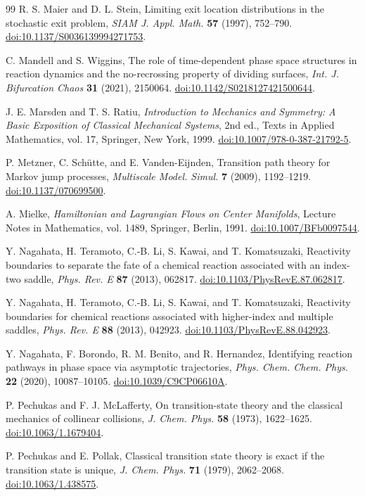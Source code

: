\documentclass[11pt]{article}
\theoremstyle{definition}
\theoremstyle{remark}
\newcommand{\doi}[1]{\href{https://doi.org/#1}{doi:#1}}
\begin{document}
\begin{thebibliography}{99}
R. S. Maier and D. L. Stein,
Limiting exit location distributions in the stochastic exit problem,
\emph{SIAM J. Appl. Math.} \textbf{57} (1997), 752--790.
\doi{10.1137/S0036139994271753}.

C. Mandell and S. Wiggins,
The role of time-dependent phase space structures in reaction dynamics and the no-recrossing property of dividing surfaces,
\emph{Int. J. Bifurcation Chaos} \textbf{31} (2021), 2150064.
\doi{10.1142/S0218127421500644}.

J. E. Marsden and T. S. Ratiu,
\emph{Introduction to Mechanics and Symmetry: A Basic Exposition of Classical Mechanical Systems},
2nd ed., Texts in Applied Mathematics, vol. 17, Springer, New York, 1999.
\doi{10.1007/978-0-387-21792-5}.

P. Metzner, C. Sch\"utte, and E. Vanden-Eijnden,
Transition path theory for Markov jump processes,
\emph{Multiscale Model. Simul.} \textbf{7} (2009), 1192--1219.
\doi{10.1137/070699500}.

A. Mielke,
\emph{Hamiltonian and Lagrangian Flows on Center Manifolds},
Lecture Notes in Mathematics, vol. 1489, Springer, Berlin, 1991.
\doi{10.1007/BFb0097544}.

Y. Nagahata, H. Teramoto, C.-B. Li, S. Kawai, and T. Komatsuzaki,
Reactivity boundaries to separate the fate of a chemical reaction associated with an index-two saddle,
\emph{Phys. Rev. E} \textbf{87} (2013), 062817.
\doi{10.1103/PhysRevE.87.062817}.

Y. Nagahata, H. Teramoto, C.-B. Li, S. Kawai, and T. Komatsuzaki,
Reactivity boundaries for chemical reactions associated with higher-index and multiple saddles,
\emph{Phys. Rev. E} \textbf{88} (2013), 042923.
\doi{10.1103/PhysRevE.88.042923}.

Y. Nagahata, F. Borondo, R. M. Benito, and R. Hernandez,
Identifying reaction pathways in phase space via asymptotic trajectories,
\emph{Phys. Chem. Chem. Phys.} \textbf{22} (2020), 10087--10105.
\doi{10.1039/C9CP06610A}.

P. Pechukas and F. J. McLafferty,
On transition-state theory and the classical mechanics of collinear collisions,
\emph{J. Chem. Phys.} \textbf{58} (1973), 1622--1625.
\doi{10.1063/1.1679404}.

P. Pechukas and E. Pollak,
Classical transition state theory is exact if the transition state is unique,
\emph{J. Chem. Phys.} \textbf{71} (1979), 2062--2068.
\doi{10.1063/1.438575}.


\end{thebibliography}
\end{document}
